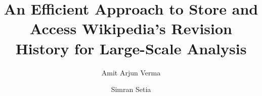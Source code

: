 \documentclass[acmsmall]{acmart}
\begin{document}
\title{An Efficient Approach to Store and Access Wikipedia's Revision History for Large-Scale Analysis}

\author{Amit Arjun Verma}

\author{Simran Setia}

\renewcommand{\shortauthors}{Amit Arjun Verma \& Simran Setia}
\end{document}
